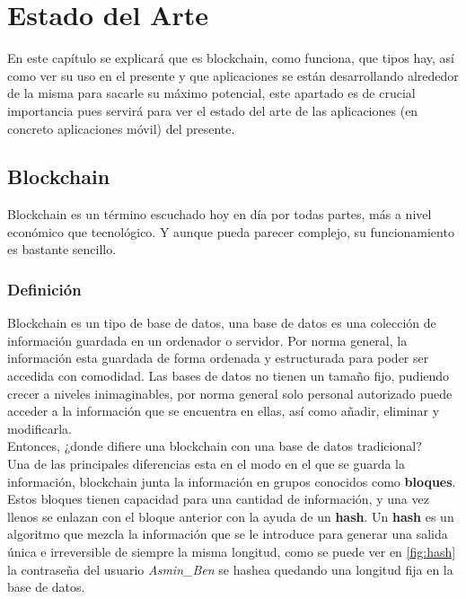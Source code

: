 \chapter{Estado del Arte}
\label{cap:EstadoArte}

\setlength{\parindent}{0pt}

En este capítulo se explicará que es blockchain, como funciona, que tipos hay, así como ver su uso en el presente y que aplicaciones se están desarrollando alrededor de la misma para sacarle su máximo potencial, este apartado es de crucial importancia pues servirá para ver el estado del arte de las aplicaciones (en concreto aplicaciones móvil) del presente.

\section{Blockchain}
Blockchain\cite{b1,b2,b3,b4} es un término escuchado hoy en día por todas partes, más a nivel económico que tecnológico. Y aunque pueda parecer complejo, su funcionamiento es bastante sencillo.

\subsection{Definición}
Blockchain es un tipo de base de datos, una base de datos es una colección de información guardada en un ordenador o servidor. Por norma general, la información esta guardada de forma ordenada y estructurada para poder ser accedida con comodidad. Las bases de datos no tienen un tamaño fijo, pudiendo crecer a niveles inimaginables, por norma general solo personal autorizado puede acceder a la información que se encuentra en ellas, así como añadir, eliminar y modificarla. \\

Entonces, ¿donde difiere una blockchain con una base de datos tradicional? \\

Una de las principales diferencias esta en el modo en el que se guarda la información, blockchain junta la información en grupos conocidos como \textbf{bloques}. Estos bloques tienen capacidad para una cantidad de información, y una vez llenos se enlazan con el bloque anterior con la ayuda de un \textbf{hash}. Un \textbf{hash}\cite{whatIsHash} es un algoritmo que mezcla la información que se le introduce para generar una salida única e irreversible de siempre la misma longitud, como se puede ver en \ref{fig:hash} la contraseña del usuario \emph{Asmin\_Ben} se hashea quedando una longitud fija en la base de datos. \\

